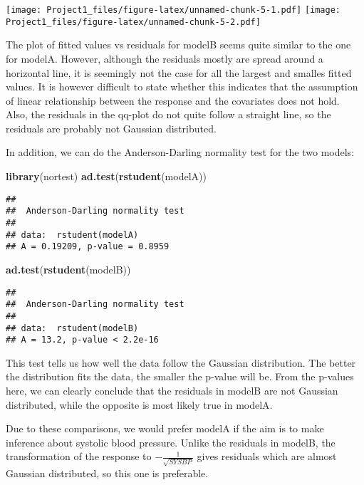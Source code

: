 \documentclass[]{article}
\newenvironment{Shaded}{\begin{snugshade}}{\end{snugshade}}
\newcommand{\KeywordTok}[1]{\textcolor[rgb]{0.13,0.29,0.53}{\textbf{#1}}}
\newcommand{\NormalTok}[1]{#1}
\begin{document}
\texttt{[image: Project1\_files/figure-latex/unnamed-chunk-5-1.pdf]}
\texttt{[image: Project1\_files/figure-latex/unnamed-chunk-5-2.pdf]}

The plot of fitted values vs residuals for modelB seems quite similar to
the one for modelA. However, although the residuals mostly are spread
around a horizontal line, it is seemingly not the case for all the
largest and smalles fitted values. It is however difficult to state
whether this indicates that the assumption of linear relationship
between the response and the covariates does not hold. Also, the
residuals in the qq-plot do not quite follow a straight line, so the
residuals are probably not Gaussian distributed.

In addition, we can do the Anderson-Darling normality test for the two
models:

\begin{Shaded}
\begin{Highlighting}[]
\KeywordTok{library}\NormalTok{(nortest)}
\KeywordTok{ad.test}\NormalTok{(}\KeywordTok{rstudent}\NormalTok{(modelA))}
\end{Highlighting}
\end{Shaded}

\begin{verbatim}
## 
##  Anderson-Darling normality test
## 
## data:  rstudent(modelA)
## A = 0.19209, p-value = 0.8959
\end{verbatim}

\begin{Shaded}
\begin{Highlighting}[]
\KeywordTok{ad.test}\NormalTok{(}\KeywordTok{rstudent}\NormalTok{(modelB))}
\end{Highlighting}
\end{Shaded}

\begin{verbatim}
## 
##  Anderson-Darling normality test
## 
## data:  rstudent(modelB)
## A = 13.2, p-value < 2.2e-16
\end{verbatim}

This test tells us how well the data follow the Gaussian distribution.
The better the distribution fits the data, the smaller the p-value will
be. From the p-values here, we can clearly conclude that the residuals
in modelB are not Gaussian distributed, while the opposite is most
likely true in modelA.

Due to these comparisons, we would prefer modelA if the aim is to make
inference about systolic blood pressure. Unlike the residuals in modelB,
the transformation of the response to \(-\frac{1}{\sqrt{SYSBP}}\) gives
residuals which are almost Gaussian distributed, so this one is
preferable.
\end{document}
